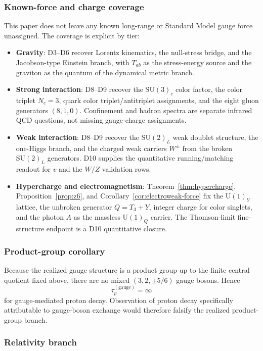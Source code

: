 \documentclass[11pt]{article}
\newcommand{\SU}{\mathrm{SU}}
\newcommand{\U}{\mathrm{U}}
\begin{document}
\subsubsection{Known-force and charge coverage}

This paper does not leave any known long-range or Standard Model gauge force unassigned. The coverage is explicit by tier:
\begin{itemize}[leftmargin=2em]
\item \textbf{Gravity}: D3--D6 recover Lorentz kinematics, the null-stress bridge, and the Jacobson-type Einstein branch, with \(T_{ab}\) as the stress-energy source and the graviton as the quantum of the dynamical metric branch.
\item \textbf{Strong interaction}: D8--D9 recover the \(\SU(3)_c\) color factor, the color triplet \(N_c=3\), quark color triplet/antitriplet assignments, and the eight gluon generators \((8,1,0)\). Confinement and hadron spectra are separate infrared QCD questions, not missing gauge-charge assignments.
\item \textbf{Weak interaction}: D8--D9 recover the \(\SU(2)_L\) weak doublet structure, the one-Higgs branch, and the charged weak carriers \(W^\pm\) from the broken \(\SU(2)_L\) generators. D10 supplies the quantitative running/matching readout for \(v\) and the \(W/Z\) validation rows.
\item \textbf{Hypercharge and electromagnetism}: Theorem~\ref{thm:hypercharge}, Proposition~\ref{prop:z6}, and Corollary~\ref{cor:electroweak-force} fix the \(\U(1)_Y\) lattice, the unbroken generator \(Q=T_3+Y\), integer charge for color singlets, and the photon \(A\) as the massless \(\U(1)_Q\) carrier. The Thomson-limit fine-structure endpoint is a D10 quantitative closure.
\end{itemize}

\subsubsection{Product-group corollary}

Because the realized gauge structure is a product group up to the finite central quotient fixed above, there are no mixed \((3,2,\pm 5/6)\) gauge bosons. Hence
\[
\tau_p^{(\mathrm{gauge})}=\infty
\]
for gauge-mediated proton decay. Observation of proton decay specifically attributable to gauge-boson exchange would therefore falsify the realized product-group branch.

\subsubsection{Relativity branch}
\end{document}
